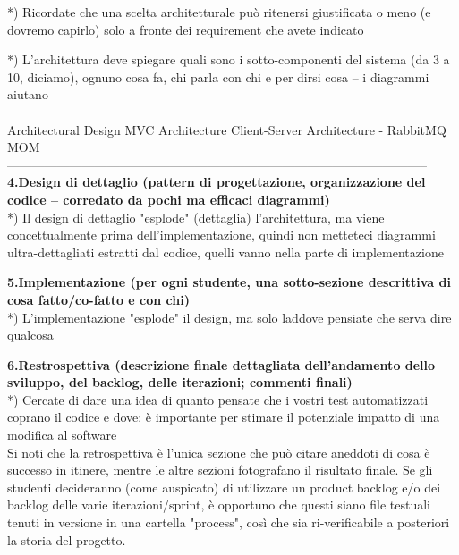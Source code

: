 \documentclass[10pt,english]{article}
\begin{document}
*) Ricordate che una scelta architetturale può ritenersi giustificata o meno (e dovremo capirlo) solo a fronte dei requirement che avete indicato

*) L'architettura deve spiegare quali sono i sotto-componenti del sistema (da 3 a 10, diciamo), ognuno cosa fa, chi parla con chi e per dirsi cosa -- i diagrammi aiutano
\\-----------------------------------------------------------------------------------------------------\\
 Architectural Design
MVC Architecture
Client-Server Architecture
 - RabbitMQ MOM 
\\-----------------------------------------------------------------------------------------------------\\

\textbf{4.Design di dettaglio (pattern di progettazione, organizzazione del codice -- corredato da pochi ma efficaci diagrammi)} \\

*) Il design di dettaglio "esplode" (dettaglia) l'architettura, ma viene concettualmente prima dell'implementazione, quindi non metteteci diagrammi ultra-dettagliati estratti dal codice, quelli vanno nella parte di implementazione

\textbf{5.Implementazione (per ogni studente, una sotto-sezione descrittiva di cosa fatto/co-fatto e con chi)} \\

*) L'implementazione "esplode" il design, ma solo laddove pensiate che serva dire qualcosa

\textbf{6.Restrospettiva (descrizione finale dettagliata dell'andamento dello sviluppo, del backlog, delle iterazioni; commenti finali)} \\

*) Cercate di dare una idea di quanto pensate che i vostri test automatizzati coprano il codice e dove: è importante per stimare il potenziale impatto di una modifica al software\\


Si noti che la retrospettiva è l'unica sezione che può citare aneddoti di cosa è successo in itinere, mentre le altre sezioni fotografano il risultato finale. Se gli studenti decideranno (come auspicato) di utilizzare un product backlog e/o dei backlog delle varie iterazioni/sprint, è opportuno che questi siano file testuali tenuti in versione in una cartella "process", così che sia ri-verificabile a posteriori la storia del progetto.\\
\end{document}
